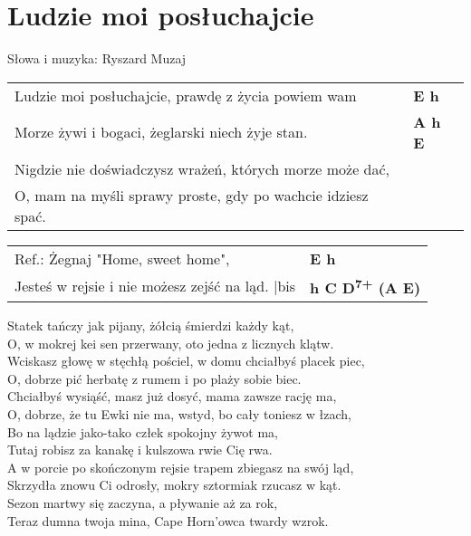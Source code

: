 \section{Ludzie moi posłuchajcie}

Słowa i muzyka: Ryszard Muzaj\\

\vspace{2em}
\begin{tabular}{@{}p{10cm}@{}l@{}}
Ludzie moi posłuchajcie, prawdę z życia powiem wam & \bfseries E h \\
Morze żywi i bogaci, żeglarski niech żyje stan. & \bfseries A h E \\
Nigdzie nie doświadczysz wrażeń, których morze może dać, \\
O, mam na myśli sprawy proste, gdy po wachcie idziesz spać. \\
\end{tabular}

\vspace{1em}
\begin{tabular}{@{}p{10cm}@{}l@{}}
Ref.: Żegnaj "Home, sweet home", & \bfseries E h \\
Jesteś w rejsie i nie możesz zejść na ląd.  |bis & \bfseries h C D\textsuperscript{7+} (A E) \\
\end{tabular}

\vspace{1em}
Statek tańczy jak pijany, żółcią śmierdzi każdy kąt, \\
O, w mokrej kei sen przerwany, oto jedna z licznych klątw. \\
Wciskasz głowę w stęchłą pościel, w domu chciałbyś placek piec, \\
O, dobrze pić herbatę z rumem i po plaży sobie biec. \\

Chciałbyś wysiąść, masz już dosyć, mama zawsze rację ma, \\
O, dobrze, że tu Ewki nie ma, wstyd, bo cały toniesz w łzach, \\
Bo na lądzie jako-tako człek spokojny żywot ma, \\
Tutaj robisz za kanakę i kulszowa rwie Cię rwa. \\

A w porcie po skończonym rejsie trapem zbiegasz na swój ląd, \\
Skrzydła znowu Ci odrosły, mokry sztormiak rzucasz w kąt. \\
Sezon martwy się zaczyna, a pływanie aż za rok, \\
Teraz dumna twoja mina, Cape Horn'owca twardy wzrok. \\

